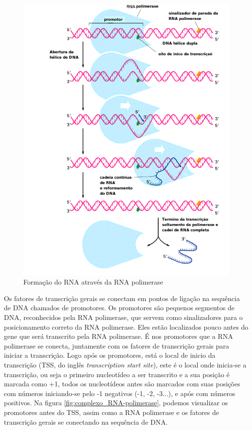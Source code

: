 \begin{figure}[htb!]
    \centering
    \includegraphics[scale=0.7]{./imagens/RNAPOLII.png}
    \caption{Formação do RNA através da RNA polimerase \cite[Adaptada]{Higgs2005}}
    \label{fig:RNAPOLII}
\end{figure}



Os fatores de transcrição gerais se conectam em pontos de ligação na sequência de DNA chamados de promotores. Os promotores são pequenos segmentos de DNA, reconhecidos pela RNA polimerase, que servem como sinalizadores para o posicionamento correto da RNA polimerase. Eles estão localizados pouco antes do gene que será transcrito pela RNA polimerase. É nos promotores que a RNA polimerase se conecta, juntamente com os fatores de transcrição gerais para iniciar a transcrição. Logo após os promotores, está o local de inicio da transcrição (TSS, do inglês \textit{transcription start site}), este é o local onde inicia-se a transcrição, ou seja o primeiro nucleotídeo a ser transcrito e a sua posição é marcada como +1, todos os nucleotídeos antes são marcados com suas posições com números iniciando-se pelo -1 negativos (-1, -2, -3...), e após com números positivos. Na figura \ref{fig:complexo_RNA-polimerase}, podemos visualizar os promotores antes do TSS, assim como a RNA polimerase e os fatores de transcrição gerais se conectando na sequência de DNA.

